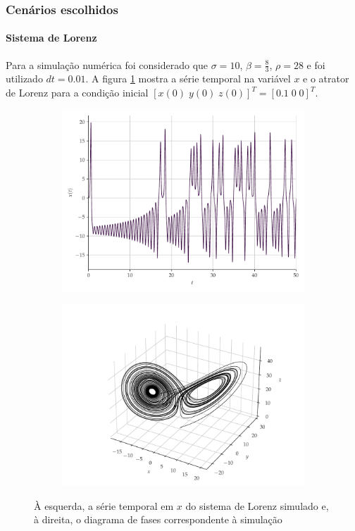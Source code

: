 \documentclass[aspectratio=169]{beamer}
\begin{document}
\begin{frame}
	\frametitle{Cenários escolhidos}
	\framesubtitle{Sistema de Lorenz}
\justifying Para a simulação numérica foi considerado que $\sigma = 10$, $\beta = \frac{8}{3}$, $\rho = 28$ e foi utilizado $dt = 0.01$. A figura \ref{fig:lorenz} mostra a série temporal na variável $x$ e o atrator de Lorenz para a condição inicial $[x(0)\; y(0)\; z(0)]^T = [0.1\; 0\; 0]^T$.
\begin{figure}[H]
     \begin{subfigure}[t]{0.3\textwidth} 
         \includegraphics[scale=0.2]{serie-lorenz-x.pdf}
     \end{subfigure}
     \centering
     \begin{subfigure}[t]{0.3\textwidth}
         \includegraphics[scale=0.2]{diagrama-de-fases-lorenz.pdf}
     \end{subfigure}
     \caption{À esquerda, a série temporal em $x$ do sistema de Lorenz simulado e, à direita, o diagrama de fases correspondente à simulação}
     \label{fig:lorenz}
\end{figure}
\end{frame}
\end{document}
